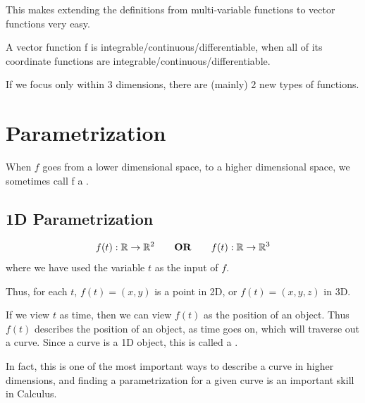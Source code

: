 This makes extending the definitions from multi-variable functions to vector functions very easy. 

\begin{definition}
    A vector function f is integrable/continuous/differentiable, when all of its coordinate functions are integrable/continuous/differentiable.
\end{definition}

If we focus only within 3 dimensions, there are (mainly) 2 new types of functions.

\section{Parametrization}

\begin{definition}[Parametrization]
    When $f$ goes from a lower dimensional space, to a higher dimensional space, we sometimes call f a .
\end{definition}

\subsection*{1D Parametrization}

$$f(t): \mathbb{R} \to \mathbb{R}^2 \qquad \text{\textbf{OR}} \qquad f(t): \mathbb{R} \to \mathbb{R}^3$$ where we have used the variable $t$ as the input of $f$.

Thus, for each $t$, $f(t) = (x, y)$ is a point in 2D, or $f(t) = (x, y, z)$ in 3D.

If we view $t$ as time, then we can view $f(t)$ as the position of an object. Thus $f(t)$ describes the position of an object, as time goes on, which will traverse out a curve. Since a curve is a 1D object, this is called a .

In fact, this is one of the most important ways to describe a curve in higher dimensions, and finding a parametrization for a given curve is an important skill in Calculus.

